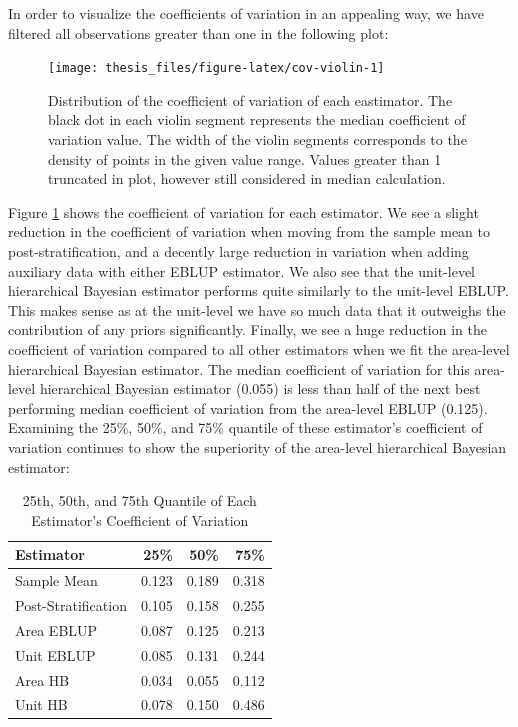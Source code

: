 \documentclass[12pt,twoside]{reedthesis}
\begin{document}
In order to visualize the coefficients of variation in an appealing way, we have filtered all observations greater than one in the following plot:
\begin{figure}

{\centering \texttt{[image: thesis\_files/figure-latex/cov-violin-1]} 

}

\caption[Distribution of the coefficient of variation of each eastimator]{Distribution of the coefficient of variation of each eastimator. The black dot in each violin segment represents the median coefficient of variation value. The width of the violin segments corresponds to the density of points in the given value range. Values greater than 1 truncated in plot, however still considered in median calculation.}\label{fig:cov-violin}
\end{figure}
Figure \ref{fig:cov-violin} shows the coefficient of variation for each estimator. We see a slight reduction in the coefficient of variation when moving from the sample mean to post-stratification, and a decently large reduction in variation when adding auxiliary data with either EBLUP estimator. We also see that the unit-level hierarchical Bayesian estimator performs quite similarly to the unit-level EBLUP. This makes sense as at the unit-level we have so much data that it outweighs the contribution of any priors significantly. Finally, we see a huge reduction in the coefficient of variation compared to all other estimators when we fit the area-level hierarchical Bayesian estimator. The median coefficient of variation for this area-level hierarchical Bayesian estimator (0.055) is less than half of the next best performing median coefficient of variation from the area-level EBLUP (0.125). Examining the 25\%, 50\%, and 75\% quantile of these estimator's coefficient of variation continues to show the superiority of the area-level hierarchical Bayesian estimator:
\begin{longtable}[t]{lrrr}
\caption[Coefficient of Variation Quantiles]{\label{tab:quantile-table}25th, 50th, and 75th Quantile of Each Estimator's Coefficient of Variation}\\
\toprule
Estimator & 25\% & 50\% & 75\%\\
\midrule
Sample Mean & 0.123 & 0.189 & 0.318\\
Post-Stratification & 0.105 & 0.158 & 0.255\\
Area EBLUP & 0.087 & 0.125 & 0.213\\
Unit EBLUP & 0.085 & 0.131 & 0.244\\
Area HB & 0.034 & 0.055 & 0.112\\
\addlinespace
Unit HB & 0.078 & 0.150 & 0.486\\
\bottomrule
\end{longtable}
\end{document}
